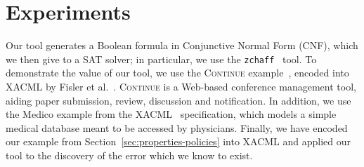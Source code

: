 \section{Experiments}
\label{sec:experiments}

Our tool generates a Boolean formula in Conjunctive Normal Form (CNF), which
we then give to a SAT solver; in particular, we use the
\texttt{zchaff}~\cite{moskewicz01chaff} tool.  To demonstrate the
value of our tool, we use the \textsc{Continue}
example~\cite{krishnamurthi03continue}, encoded into XACML by Fisler
et al.~\cite{fisler05}.  \textsc{Continue} is a Web-based conference
management tool, aiding paper submission, review, discussion and
notification.  In addition, we use the Medico example from the
XACML~\cite{xacml} specification, which models a simple medical
database meant to be accessed by physicians.  Finally, we have encoded
our example from Section~\ref{sec:properties-policies} into XACML and
applied our tool to the discovery of the error which we know to exist.

